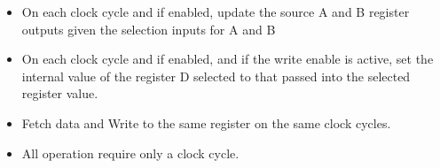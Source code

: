 \begin{itemize}
\item On each clock cycle and if enabled, update the source A and B register outputs given the selection inputs for A and B
\item On each clock cycle and if enabled, and if the write enable is active, set the internal value of the register D selected to that passed into the selected register value.
\item Fetch data and Write to the same register on the same clock cycles.
\item All operation require only a clock cycle.
\end{itemize} 
